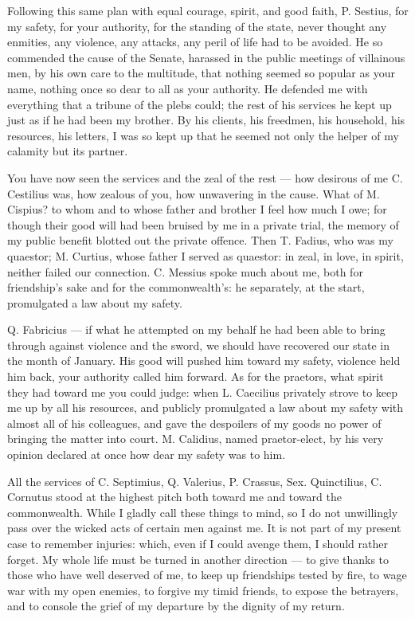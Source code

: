  Following this same plan with equal courage, spirit, and good faith, P. Sestius, for my safety, for your authority, for the standing of the state, never thought any enmities, any violence, any attacks, any peril of life had to be avoided. He so commended the cause of the Senate, harassed in the public meetings of villainous men, by his own care to the multitude, that nothing seemed so popular as your name, nothing once so dear to all as your authority. He defended me with everything that a tribune of the plebs could; the rest of his services he kept up just as if he had been my brother. By his clients, his freedmen, his household, his resources, his letters, I was so kept up that he seemed not only the helper of my calamity but its partner.

 You have now seen the services and the zeal of the rest --- how desirous of me C. Cestilius was, how zealous of you, how unwavering in the cause. What of M. Cispius? to whom and to whose father and brother I feel how much I owe; for though their good will had been bruised by me in a private trial, the memory of my public benefit blotted out the private offence. Then T. Fadius, who was my quaestor; M. Curtius, whose father I served as quaestor: in zeal, in love, in spirit, neither failed our connection. C. Messius spoke much about me, both for friendship's sake and for the commonwealth's: he separately, at the start, promulgated a law about my safety.

 Q. Fabricius --- if what he attempted on my behalf he had been able to bring through against violence and the sword, we should have recovered our state in the month of January. His good will pushed him toward my safety, violence held him back, your authority called him forward. As for the praetors, what spirit they had toward me you could judge: when L. Caecilius privately strove to keep me up by all his resources, and publicly promulgated a law about my safety with almost all of his colleagues, and gave the despoilers of my goods no power of bringing the matter into court. M. Calidius, named praetor-elect, by his very opinion declared at once how dear my safety was to him.

 All the services of C. Septimius, Q. Valerius, P. Crassus, Sex. Quinctilius, C. Cornutus stood at the highest pitch both toward me and toward the commonwealth. While I gladly call these things to mind, so I do not unwillingly pass over the wicked acts of certain men against me. It is not part of my present case to remember injuries: which, even if I could avenge them, I should rather forget. My whole life must be turned in another direction --- to give thanks to those who have well deserved of me, to keep up friendships tested by fire, to wage war with my open enemies, to forgive my timid friends, to expose the betrayers, and to console the grief of my departure by the dignity of my return.

